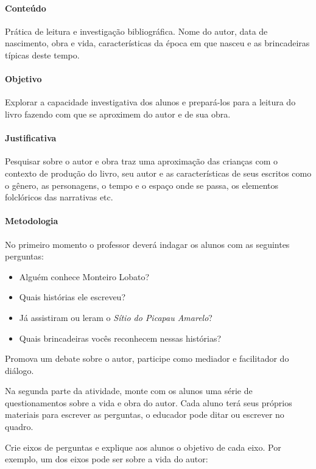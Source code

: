 \documentclass[11pt]{extarticle}
\begin{document}
\paragraph{Conteúdo} Prática de leitura e investigação bibliográfica. Nome do autor, data de nascimento, obra e vida, características da época em que nasceu e as brincadeiras típicas deste tempo.  


\paragraph{Objetivo} Explorar a capacidade investigativa dos alunos e prepará-los para a leitura do livro fazendo com que se aproximem do autor e de sua obra.


\paragraph{Justificativa} Pesquisar sobre o autor e obra traz uma aproximação das crianças com o contexto de produção do livro, seu autor e as características de seus escritos como o gênero, as personagens, o tempo e o espaço onde se passa, os elementos folclóricos das narrativas etc. 

\paragraph{Metodologia} No primeiro momento o professor deverá indagar os alunos com as seguintes perguntas:


\begin{itemize}
\item Alguém conhece Monteiro Lobato?

\item Quais histórias ele escreveu?

\item Já assistiram ou leram o \textit{Sítio do Picapau Amarelo}?

\item Quais brincadeiras vocês reconhecem nessas histórias?
\end{itemize}

Promova um debate sobre o autor, participe como mediador e facilitador do diálogo.

Na segunda parte da atividade, monte com os alunos uma série de questionamentos sobre a vida e obra do autor. Cada aluno terá seus próprios materiais para escrever as perguntas, o educador pode ditar ou escrever no quadro.

Crie eixos de perguntas e explique aos alunos o objetivo de cada eixo.
Por exemplo, um dos eixos pode ser sobre a vida do autor:
\end{document}
